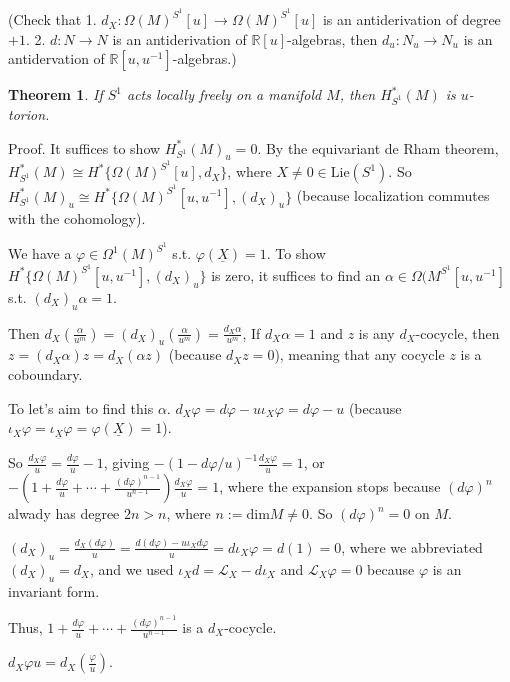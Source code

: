 \documentclass{article}
\theoremstyle{mystyle}
\newtheorem*{theorem*}{Theorem}
\theoremstyle{remark}
\numberwithin{equation}{section}
\begin{document}
(Check that 1. $d_X\colon \Omega(M)^{S^1}[u]\rightarrow \Omega(M)^{S^1}[u]$ is an antiderivation of degree $+1$. 2. $d\colon N\rightarrow N$ is an antiderivation of $\mathbb{R}[u]$-algebras, then $d_u\colon N_u\rightarrow N_u$ is an antidervation of $\mathbb{R}[u,u^{-1}]$-algebras.)
 
\begin{theorem*} If $S^1$ acts locally freely on a manifold $M$, then $H^*_{S^1}(M)$ is $u$-torion.
\end{theorem*}

Proof. It suffices to show $H^*_{S^1}(M)_u=0$. By the equivariant de Rham theorem, $H^*_{S^1}(M) \cong H^*\{\Omega(M)^{S^1}[u],d_X\}$, where $X\neq 0 \in \mathrm{Lie}(S^1)$. So $H^*_{S^1}(M)_u \cong H^*\{\Omega(M)^{S^1}[u,u^{-1}],(d_X)_u\}$ (because localization commutes with the cohomology). 

We have a $\varphi\in \Omega^1(M)^{S^1}$ s.t. $\varphi(\underline{X}) =1$. To show $H^*\{\Omega(M)^{S^1}[u,u^{-1}],(d_X)_u\}$ is zero, it suffices to find an $\alpha \in \Omega(M^{S^1}[u,u^{-1}]$ s.t. $(d_X)_u \alpha =1$. 

Then $d_X\left(\frac{\alpha}{u^m}\right)  = (d_X)_u
\left(\frac{\alpha}{u^m}\right)
= \frac{d_X\alpha}{u^m}$, 
If $d_X\alpha=1$ and $z$ is any $d_X$-cocycle, then $z = (d_X\alpha) z = d_X(\alpha z)$ (because $d_Xz=0$), meaning that any cocycle $z$ is a coboundary.

To let's aim to find this $\alpha$. $d_X\varphi = d \varphi - u \iota_X \varphi
= d\varphi - u$ (because $\iota_X\varphi = \iota_{\underline{X}}\varphi = \varphi(\underline{X}) = 1$).

So $\frac{d_X\varphi}{u} = \frac{d\varphi}{u} - 1$, giving $-(1-d\varphi/u)^{-1} \frac{d_X\varphi}{u} = 1$, or $-\left(1+ \frac{d\varphi}{u} + \cdots + \frac{(d\varphi)^{n-1}}{u^{n-1}}\right)\frac{d_X\varphi}{u} = 1$, where the expansion stops because $(d\varphi)^n$ alwady has degree $2n>n$, where $n := \mathrm{dim}M\neq 0$. So $(d\varphi)^n=0$ on $M$. 


$(d_X)_u = \frac{d_X(d\varphi)}{u} = \frac{d(d\varphi)-u\iota_Xd\varphi}{u} = d\iota_X \varphi = d(1) =0$, where we abbreviated $(d_X)_u = d_X$, and we used $\iota_Xd = \mathcal{L}_X-d\iota_X$ and $\mathcal{L}_X\varphi=0$ because $\varphi$ is an invariant form. 

Thus, $1+\frac{d\varphi}{u}+\cdots + \frac{(d\varphi)^{n-1}}{u^{n-1}}$ is a $d_X$-cocycle.

$d_X\varphi {u} = d_X\left(\frac{\varphi}{u}\right)$. 
\end{document}
